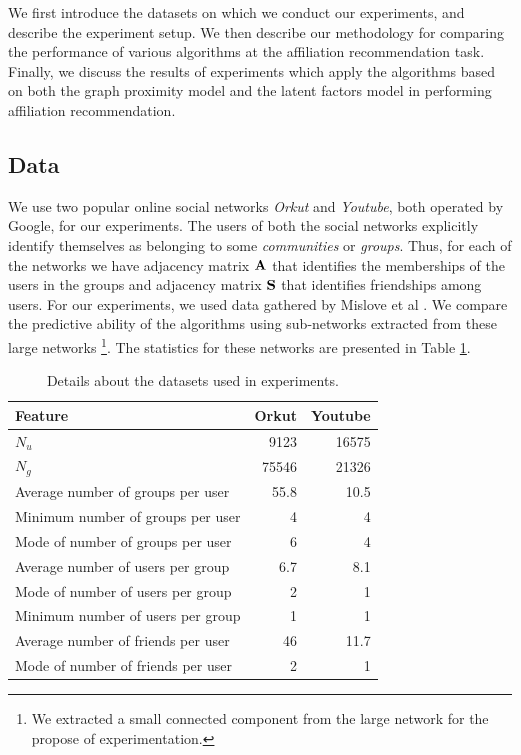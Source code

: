 We first introduce the datasets on which we conduct our experiments, and describe the experiment setup. We then describe our methodology for comparing the performance of various algorithms at the affiliation recommendation task. Finally, we discuss the results of experiments which apply the algorithms based on both the graph proximity model and the latent factors model in performing affiliation recommendation.

\subsection{Data}
We use two popular online social networks \textit{Orkut} and \textit{Youtube}, both operated by Google, for our experiments. The users of both the social networks explicitly identify themselves as belonging to some \textit{communities} or \textit{groups}. Thus, for each of the networks we have adjacency matrix $\mathbf{A}$ that identifies the memberships of the users in the groups and adjacency matrix $\mathbf{S}$ that identifies friendships among users. For our experiments, we used data gathered by Mislove et al \cite{Mislove}. We compare the predictive ability of the algorithms using sub-networks extracted from these large networks \footnote{We extracted a small connected component from the large network for the propose of experimentation.}. The statistics for these networks are presented in Table \ref{tab:datasets}.

\begin{table}[h!]
\centering
\begin{tabular}{| l | r | r |} \hline
Feature & Orkut & Youtube\\ \hline
$N_{u}$ & 9123 & 16575 \\ \hline
$N_{g}$ & 75546 & 21326 \\ \hline
Average number of groups per user & 55.8 & 10.5\\ \hline
Minimum number of groups per user & 4 & 4\\ \hline
Mode of number of groups per user & 6 & 4\\ \hline
Average number of users per group & 6.7 & 8.1\\ \hline
Mode of number of users per group & 2 & 1 \\ \hline
Minimum number of users per group & 1 & 1\\ \hline
Average number of friends per user & 46 & 11.7\\ \hline
Mode of number of friends per user & 2 & 1\\ \hline
\end{tabular}
\caption{Details about the datasets used in experiments.}
\label{tab:datasets}
\end{table}


